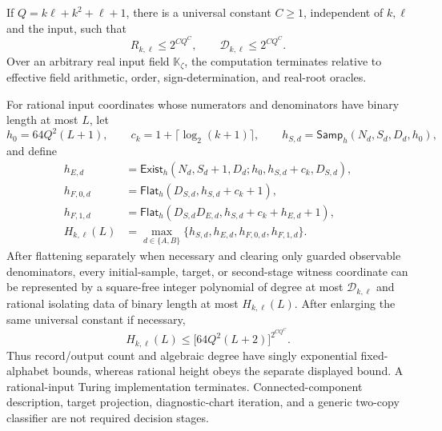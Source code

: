 If \(Q=k\ell+k^2+\ell+1\), there is a universal constant \(C\ge1\), independent of \(k,\ell\) and the input, such that
\[
 R_{k,\ell}\le 2^{CQ^C},
 \qquad
 \mathcal D_{k,\ell}\le 2^{CQ^C}.
\]
Over an arbitrary real input field \(\mathbb K_{\zeta}\), the computation terminates relative to effective field arithmetic, order, sign-determination, and real-root oracles.

For rational input coordinates whose numerators and denominators have binary length at most \(L\), let
\[
 h_0=64Q^2(L+1),
 \qquad
 c_k=1+\lceil\log_2(k+1)\rceil,
 \qquad
 h_{S,d}=\mathsf{Samp}_h(N_d,S_d,D_d,h_0),
\]
and define
\[
 \begin{aligned}
 h_{E,d}
 &=\mathsf{Exist}_h
   (N_d,S_d+1,D_d;h_0,h_{S,d}+c_k,D_{S,d}),\\
 h_{F,0,d}
 &=\mathsf{Flat}_h(D_{S,d},h_{S,d}+c_k+1),\\
 h_{F,1,d}
 &=\mathsf{Flat}_h
   (D_{S,d}D_{E,d},h_{S,d}+c_k+h_{E,d}+1),\\
 H_{k,\ell}(L)
 &=\max_{d\in\{A,B\}}
   \{h_{S,d},h_{E,d},h_{F,0,d},h_{F,1,d}\}.
 \end{aligned}
\]
After flattening separately when necessary and clearing only guarded observable denominators, every initial-sample, target, or second-stage witness coordinate can be represented by a square-free integer polynomial of degree at most \(\mathcal D_{k,\ell}\) and rational isolating data of binary length at most \(H_{k,\ell}(L)\).  After enlarging the same universal constant if necessary,
\[
 H_{k,\ell}(L)
 \le \bigl[64Q^2(L+2)\bigr]^{2^{CQ^C}}.
\]
Thus record/output count and algebraic degree have singly exponential fixed-alphabet bounds, whereas rational height obeys the separate displayed bound.  A rational-input Turing implementation terminates.  Connected-component description, target projection, diagnostic-chart iteration, and a generic two-copy classifier are not required decision stages.
